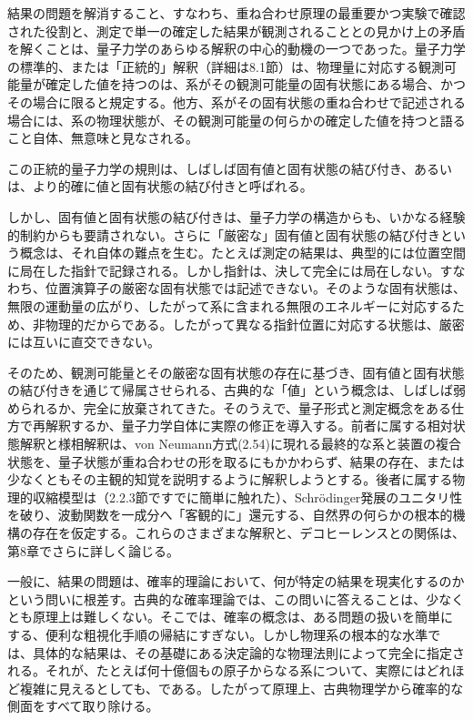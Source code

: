結果の問題を解消すること、すなわち、重ね合わせ原理の最重要かつ実験で確認された役割と、測定で単一の確定した結果が観測されることとの見かけ上の矛盾を解くことは、量子力学のあらゆる解釈の中心的動機の一つであった。量子力学の標準的、または「正統的」解釈（詳細は8.1節）は、物理量に対応する観測可能量が確定した値を持つのは、系がその観測可能量の固有状態にある場合、かつその場合に限ると規定する。他方、系がその固有状態の重ね合わせで記述される場合には、系の物理状態が、その観測可能量の何らかの確定した値を持つと語ること自体、無意味と見なされる。

\hypertarget{srcpage:59}{}\label{srcpage:59}
この正統的量子力学の規則は、しばしば固有値と固有状態の結び付き、あるいは、より的確に値と固有状態の結び付きと呼ばれる。

しかし、固有値と固有状態の結び付きは、量子力学の構造からも、いかなる経験的制約からも要請されない\cite{ref068}。さらに「厳密な」固有値と固有状態の結び付きという概念は、それ自体の難点を生む。たとえば測定の結果は、典型的には位置空間に局在した指針で記録される。しかし指針は、決して完全には局在しない。すなわち、位置演算子の厳密な固有状態では記述できない。そのような固有状態は、無限の運動量の広がり、したがって系に含まれる無限のエネルギーに対応するため、非物理的だからである。したがって異なる指針位置に対応する状態は、厳密には互いに直交できない。

そのため、観測可能量とその厳密な固有状態の存在に基づき、固有値と固有状態の結び付きを通じて帰属させられる、古典的な「値」という概念は、しばしば弱められるか、完全に放棄されてきた。そのうえで、量子形式と測定概念をある仕方で再解釈するか、量子力学自体に実際の修正を導入する。前者に属する相対状態解釈と様相解釈は、von Neumann方式(2.54)に現れる最終的な系と装置の複合状態を、量子状態が重ね合わせの形を取るにもかかわらず、結果の存在、または少なくともその主観的知覚を説明するように解釈しようとする。後者に属する物理的収縮模型は（2.2.3節ですでに簡単に触れた）、Schrödinger発展のユニタリ性を破り、波動関数を一成分へ「客観的に」還元する、自然界の何らかの根本的機構の存在を仮定する。これらのさまざまな解釈と、デコヒーレンスとの関係は、第8章でさらに詳しく論じる。

一般に、結果の問題は、確率的理論において、何が特定の結果を現実化するのかという問いに根差す。古典的な確率理論では、この問いに答えることは、少なくとも原理上は難しくない。そこでは、確率の概念は、ある問題の扱いを簡単にする、便利な粗視化手順の帰結にすぎない。しかし物理系の根本的な水準では、具体的な結果は、その基礎にある決定論的な物理法則によって完全に指定される。それが、たとえば何十億個もの原子からなる系について、実際にはどれほど複雑に見えるとしても、である。したがって原理上、古典物理学から確率的な側面をすべて取り除ける。

